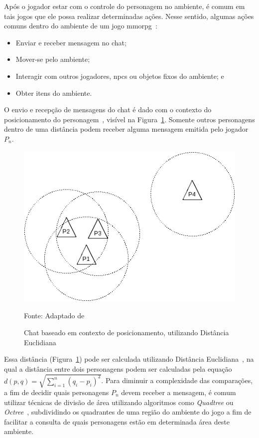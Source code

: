 Após o jogador estar com o controle do personagem no ambiente, é comum em tais jogos que ele possa realizar determinadas ações.
%
Nesse sentido, algumas ações comuns dentro do ambiente de um jogo \ac{mmorpg}~\cite{mmorpg_culture}:

\begin{itemize}
  \item Enviar e receber mensagem no chat;
  \item Mover-se pelo ambiente;
  \item Interagir com outros jogadores, \ac{npcs} ou objetos fixos do ambiente; e
  \item Obter itens do ambiente.
\end{itemize}



O envio e recepção de mensagens do chat é dado com o contexto do posicionamento do personagem~\cite{albion_online_unite}, visível na Figura~\ref{fig:chat}.
%
Somente outros personagens dentro de uma distância podem receber alguma mensagem emitida pelo jogador $P_n$.

\begin{figure}[htb!]
\caption{Chat baseado em contexto de posicionamento, utilizando Distância Euclidiana}
\label{fig:chat}
\includegraphics[height=8cm]{img/cap2/chat.png}
\centering

Fonte: Adaptado de ~\cite{albion_online_unite}
\end{figure}

Essa distância (Figura~\ref{fig:chat}) pode ser calculada utilizando Distância Euclidiana~\cite{Deza2009Aug}, na qual a distância entre dois personagens podem ser calculadas pela equação $d(p, q) = \sqrt{\sum_{i=1}^{n}(q_i - p_i)^2}$.
%
Para diminuir a complexidade das comparações, a fim de decidir quais personagens $P_n$ devem receber a mensagem, é comum utilizar técnicas de divisão de área utilizando algoritmos como \textit{Quadtree} ou \textit{Octree}~\cite{Lengyel2011Jun}, subdividindo os quadrantes de uma região do ambiente do jogo a fim de facilitar a consulta de quais personagens estão em determinada área deste ambiente.



